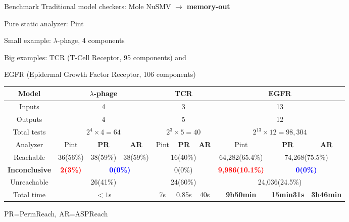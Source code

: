 \documentclass[8pt]{beamer}
\begin{document}
\begin{frame}{Benchmark}
Traditional model checkers: Mole NuSMV $\to$ \textbf{memory-out}

Pure static analyzer: Pint \cite{folschette2015}

Small example: $\lambda$-phage, 4 components

Big examples: TCR (T-Cell Receptor, 95 components) and

EGFR (Epidermal Growth Factor Receptor, 106 components)

\scriptsize
\begin{table}[t]
\begin{tabular}{|c|c|c|c|c|c|c|c|c|c|}
    \hline
  	Model	&\multicolumn{3}{c|}{$\lambda$-phage}	&	  \multicolumn{3}{c|}{TCR} & \multicolumn{3}{c|}{EGFR}  \\
    \hline
    Inputs&\multicolumn{3}{c|}{4}	&	  \multicolumn{3}{c|}{3} & \multicolumn{3}{c|}{13}\\
    \hline
    Outputs&\multicolumn{3}{c|}{4} &	  \multicolumn{3}{c|}{5} & \multicolumn{3}{c|}{12} \\
    \hline
    Total tests&\multicolumn{3}{c|}{$2^4\times 4=64$} & \multicolumn{3}{c|}{$2^3\times 5=40$} & \multicolumn{3}{c|}{$2^{13}\times 12=98,304$}\\
    \hline
    Analyzer  &  Pint  &  \textbf{PR}   &\textbf{AR}    &  Pint  &  \textbf{PR}     &\textbf{AR}   &  Pint  &  \textbf{PR}     &\textbf{AR}             \\
    \hline
    Reachable    & 36(56\%)& 38(59\%)& 38(59\%)   &  \multicolumn{3}{c|}{16(40\%)}  & 64,282(65.4\%)  & \multicolumn{2}{c|}{74,268(75.5\%)}\\
    \hline
    \textbf{Inconclusive} & \textcolor{red}{\textbf{2(3\%)}}&\multicolumn{2}{c|}{\textcolor{blue}{\textbf{0(0\%)}}}& \multicolumn{3}{c|}{0(0\%)}    &\textcolor{red}{\textbf{9,986(10.1\%)}}&\multicolumn{2}{c|}{\textcolor{blue}{\textbf{0(0\%)}}}  \\
    \hline
    Unreachable     &  \multicolumn{3}{c|}{26(41\%)} &  \multicolumn{3}{c|}{24(60\%)} &\multicolumn{3}{c|}{24,036(24.5\%)}\\
    \hline
    Total time &  \multicolumn{3}{c|}{$<1$s}        &  7s     &0.85s  &  40s        & \textbf{9h50min}      & \textbf{15min31s}         & \textbf{3h46min}      \\
    \hline
    \end{tabular}
\end{table}
PR=PermReach, AR=ASPReach


\end{frame}
\end{document}
